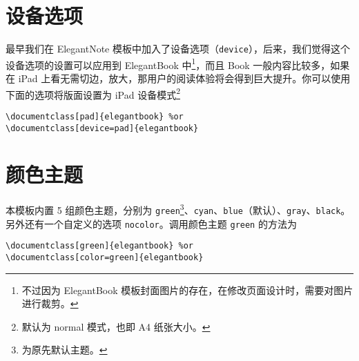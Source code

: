 \documentclass[cn,11pt]{elegantbook}
\begin{document}
\section{设备选项}
最早我们在 ElegantNote 模板中加入了设备选项（\lstinline{device}），后来，我们觉得这个设备选项的设置可以应用到 ElegantBook 中\footnote{不过因为 ElegantBook 模板封面图片的存在，在修改页面设计时，需要对图片进行裁剪。}，而且 Book 一般内容比较多，如果在 iPad 上看无需切边，放大，那用户的阅读体验将会得到巨大提升。你可以使用下面的选项将版面设置为 iPad 设备模式\footnote{默认为 normal 模式，也即 A4 纸张大小。}
\begin{lstlisting}
\documentclass[pad]{elegantbook} %or
\documentclass[device=pad]{elegantbook}
\end{lstlisting}

\section{颜色主题}
本模板内置 5 组颜色主题，分别为 \textcolor{structure1}{\lstinline{green}}\footnote{为原先默认主题。}、\textcolor{structure2}{\lstinline{cyan}}、\textcolor{structure3}{\lstinline{blue}}（默认）、\textcolor{structure4}{\lstinline{gray}}、\textcolor{structure5}{\lstinline{black}}。另外还有一个自定义的选项  \lstinline{nocolor}。调用颜色主题 \lstinline{green} 的方法为 
\begin{lstlisting}
\documentclass[green]{elegantbook} %or
\documentclass[color=green]{elegantbook}
\end{lstlisting}
\end{document}
